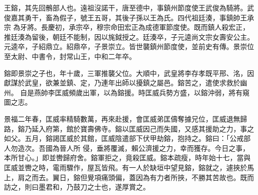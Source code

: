 
\begin{pinyinscope}

 王鎔，其先回鶻部人也。遠祖沒諾干，唐至德中，事鎮州節度使王武俊為騎將。武俊嘉其勇干，畜為假子，號王五哥，其後子孫以王為氏。四代祖廷湊，事鎮帥王承宗
 為牙將。長慶初，承宗卒，穆宗命田宏正為成德軍節度使。既而鎮人殺宏正，推廷湊為留後，朝廷不能制，因以旄鉞授之。廷湊卒，子元逵尚文宗女壽安公主。元逵卒，子紹鼎立。紹鼎卒，子景崇立。皆世襲鎮州節度使，並前史有傳。景崇位至太尉、中書令，封常山王，中和二年卒。


鎔即景崇之子也，年十歲，三軍推襲父位。大順中，武皇將李存孝既平邢、洺，因獻謀於武皇，欲兼並鎮、定，乃連年出師以擾鎮之屬邑。鎔苦之，遣使求救於幽州。
 自是燕帥李匡威頻歲出軍，以為鎔援。時匡威兵勢方盛，以鎔沖弱，將有窺圖之志。


景福二年春，匡威率精騎數萬，再來赴援，會匡威弟匡儔奪據兄位，匡威退無歸路，鎔乃延入府第，館於寶壽佛寺。鎔以匡威因己而失國，又感其援助之力，事之如父。五月，鎔謁匡威於其館，匡威陰遣部下伏甲劫鎔，抱持之。鎔曰：「公戒部人勿造次。吾國為晉人所
 侵，垂將覆滅，賴公濟援之力，幸而獲存。今日之事，本所甘心。」即並轡歸府舍。鎔軍拒之，竟殺匡威。鎔本疏瘦，時年始十七，當與匡威並轡之時，電雨驟作，屋瓦皆飛。有一人於缺垣中望見鎔，鎔就之，遽挾於馬上，肩之而去。翼日，鎔但覺項痛頭偏，蓋因為有力者所挾，不勝其苦故也。既而訪之，則曰墨君和，乃鼓刀之士也，遂厚賞之。



\end{pinyinscope}
